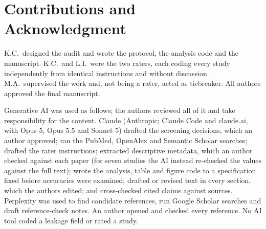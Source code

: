 \documentclass[conference]{../06_Manuscript/template/IEEEtran/IEEEtran}
\begin{document}
\section*{Contributions and Acknowledgment}
K.C.\ designed the audit and wrote the protocol, the analysis code and the manuscript. K.C.\ and L.I.\ were the
two raters, each coding every study independently from identical instructions and without discussion. M.A.\
supervised the work and, not being a rater, acted as tiebreaker. All authors approved the final manuscript.

Generative AI was used as follows; the authors reviewed all of it and take responsibility for the content. Claude (Anthropic; Claude Code and claude.ai, with Opus 5, Opus 5.5 and Sonnet 5) drafted the screening decisions, which an author approved; ran the PubMed, OpenAlex and Semantic Scholar searches; drafted the rater instructions; extracted descriptive metadata, which an author checked against each paper (for seven studies the AI instead re-checked the values against the full text); wrote the analysis, table and figure code to a specification fixed before accuracies were examined; drafted or revised text in every section, which the authors edited; and cross-checked cited claims against sources. Perplexity was used to find candidate references, run Google Scholar searches and draft reference-check notes. An author opened and checked every reference. No AI tool coded a leakage field or rated a study.




\end{document}
